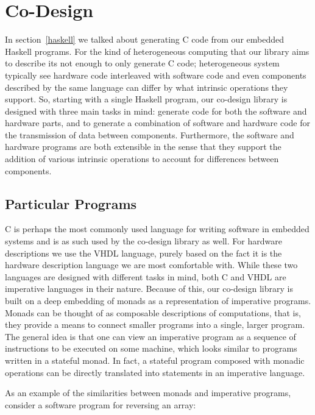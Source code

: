\documentclass[../main.tex]{subfiles}
\begin{document}
\chapter{Co-Design}
\label{codesign}

In section~\ref{haskell} we talked about generating C code from our embedded Haskell programs. For the kind of heterogeneous computing that our library aims to describe its not enough to only generate C code; heterogeneous system typically see hardware code interleaved with software code and even components described by the same language can differ by what intrinsic operations they support. So, starting with a single Haskell program, our co-design library is designed with three main tasks in mind: generate code for both the software and hardware parts, and to generate a combination of software and hardware code for the transmission of data between components. Furthermore, the software and hardware programs are both extensible in the sense that they support the addition of various intrinsic operations to account for differences between components.

\section{Particular Programs}

C is perhaps the most commonly used language for writing software in embedded systems and is as such used by the co-design library as well. For hardware descriptions we use the VHDL language, purely based on the fact it is the hardware description language we are most comfortable with. While these two languages are designed with different tasks in mind, both C and VHDL are imperative languages in their nature. Because of this, our co-design library is built on a deep embedding of monads as a representation of imperative programs. Monads can be thought of as composable descriptions of computations, that is, they provide a means to connect smaller programs into a single, larger program. The general idea is that one can view an imperative program as a sequence of instructions to be executed on some machine, which looks similar to programs written in a stateful monad. In fact, a stateful program composed with monadic operations can be directly translated into statements in an imperative language.

As an example of the similarities between monads and imperative programs, consider a software program for reversing an array:

\end{document}
